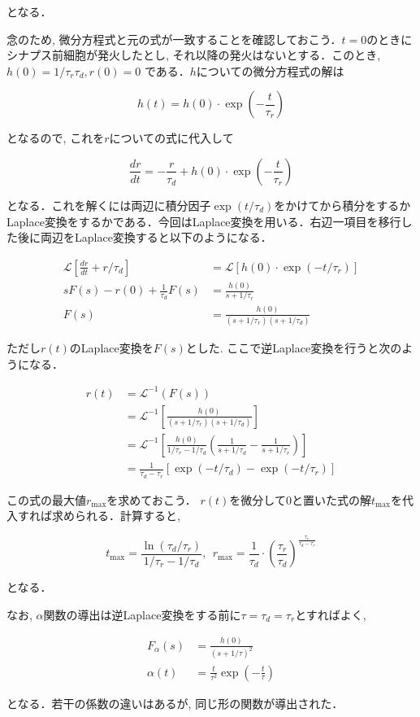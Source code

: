 となる．

念のため, 微分方程式と元の式が一致することを確認しておこう．$t=0$のときにシナプス前細胞が発火したとし, それ以降の発火はないとする．このとき, $h(0)=1/\tau_{r}\tau_{d}, r(0)=0$ である．$h$についての微分方程式の解は


\begin{equation}
h(t)=h(0)\cdot \exp\left(-\frac{t}{\tau_r}\right)    
\end{equation}


となるので, これを$r$についての式に代入して


\begin{equation}
\frac{dr}{dt}=-\frac{r}{\tau_{d}}+h(0)\cdot \exp\left(-\frac{t}{\tau_r}\right) 
\end{equation}


となる．これを解くには両辺に積分因子$\exp({t}/{\tau_d})$をかけてから積分をするかLaplace変換をするかである．今回はLaplace変換を用いる．右辺一項目を移行した後に両辺をLaplace変換すると以下のようになる．


\begin{align}
\mathcal{L}\left[\frac{dr}{dt}+r/\tau_{d}\right]&=\mathcal{L}\left[h(0)\cdot \exp\left(-t/\tau_r\right)\right]\\
sF(s)-r(0)+\frac{1}{\tau_{d}}F(s)&=\frac{h(0)}{s+1/\tau_r}\\
F(s)&=\frac{h(0)}{(s+1/\tau_r)(s+1/\tau_d)}
\end{align}


ただし$r(t)$のLaplace変換を$F(s)$とした. ここで逆Laplace変換を行うと次のようになる．


\begin{align}
r(t)&=\mathcal{L}^{-1}(F(s))\\
&=\mathcal{L}^{-1}\left[\frac{h(0)}{(s+1/\tau_r)(s+1/\tau_d)}\right]\\
&=\mathcal{L}^{-1}\left[\frac{h(0)}{1/\tau_r-1/\tau_d}\left(\frac{1}{s+1/\tau_d}-\frac{1}{s+1/\tau_r}\right)\right]\\
&=\frac{1}{\tau_d-\tau_r}\left[\exp(-t/\tau_d)-\exp(-t/\tau_r)\right]
\end{align}


この式の最大値$r_{\max}$を求めておこう． $r(t)$を微分して0と置いた式の解$t_{\max}$を代入すれば求められる．計算すると, 


\begin{equation}
t_{\max}=\dfrac{\ln(\tau_d/\tau_r)}{1/\tau_r-1/\tau_d},\ \ r_{\max}=\dfrac{1}{\tau_{d}}\cdot \left(\dfrac{\tau_{r}}{\tau_{d}}\right)^{\frac{\tau_{r}}{\tau_d-\tau_{r}}}    
\end{equation}


となる．

なお, $\alpha$関数の導出は逆Laplace変換をする前に$\tau=\tau_d=\tau_r$とすればよく, 


\begin{align}
F_\alpha(s)&=\frac{h(0)}{(s+1/\tau)^2}\\
\alpha(t)&=\frac{t}{\tau^2}\exp\left(-\frac{t}{\tau}\right)
\end{align}

となる．若干の係数の違いはあるが, 同じ形の関数が導出された． 
